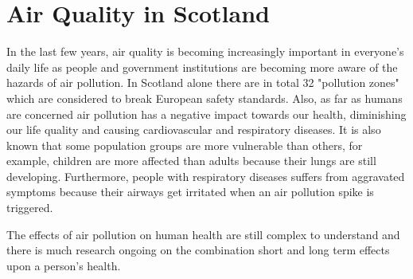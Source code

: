 \section{Air Quality in Scotland}
In the last few years, air quality is becoming increasingly important in everyone's daily life as people and government institutions are becoming more aware of the hazards of air pollution. In Scotland alone there are in total 32 "pollution zones" which are considered to break European safety standards. Also, as far as humans are concerned air pollution has a negative impact towards our health, diminishing our life quality and causing cardiovascular and respiratory diseases. It is also known that some population groups are more vulnerable than others, for example, children are more affected than adults because their lungs are still developing. Furthermore, people with respiratory diseases suffers from aggravated symptoms because their airways get irritated when an air pollution spike is triggered. 


The effects of air pollution on human health are still complex to understand and there is much research ongoing on the combination short and long term effects upon a person's health. 

